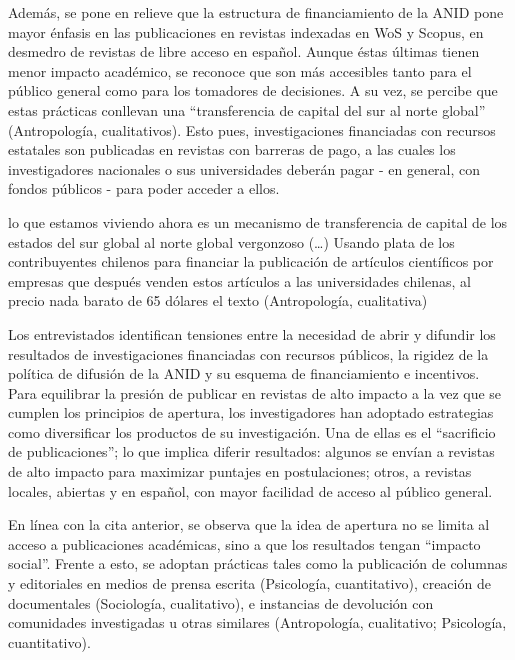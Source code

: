 \documentclass[
  letterpaper,
  DIV=11,
  numbers=noendperiod]{scrreprt}
\begin{document}
Además, se pone en relieve que la estructura de financiamiento de la
ANID pone mayor énfasis en las publicaciones en revistas indexadas en
WoS y Scopus, en desmedro de revistas de libre acceso en español. Aunque
éstas últimas tienen menor impacto académico, se reconoce que son más
accesibles tanto para el público general como para los tomadores de
decisiones. A su vez, se percibe que estas prácticas conllevan una
``transferencia de capital del sur al norte global'' (Antropología,
cualitativos). Esto pues, investigaciones financiadas con recursos
estatales son publicadas en revistas con barreras de pago, a las cuales
los investigadores nacionales o sus universidades deberán pagar - en
general, con fondos públicos - para poder acceder a ellos.

\begin{tcolorbox}[enhanced jigsaw, bottomrule=.15mm, breakable, colback=white, left=2mm, leftrule=.75mm, arc=.35mm, opacityback=0, rightrule=.15mm, toprule=.15mm]

lo que estamos viviendo ahora es un mecanismo de transferencia de
capital de los estados del sur global al norte global vergonzoso
(\ldots) Usando plata de los contribuyentes chilenos para financiar la
publicación de artículos científicos por empresas que después venden
estos artículos a las universidades chilenas, al precio nada barato de
65 dólares el texto (Antropología, cualitativa)

\end{tcolorbox}

Los entrevistados identifican tensiones entre la necesidad de abrir y
difundir los resultados de investigaciones financiadas con recursos
públicos, la rigidez de la política de difusión de la ANID y su esquema
de financiamiento e incentivos. Para equilibrar la presión de publicar
en revistas de alto impacto a la vez que se cumplen los principios de
apertura, los investigadores han adoptado estrategias como diversificar
los productos de su investigación. Una de ellas es el ``sacrificio de
publicaciones''; lo que implica diferir resultados: algunos se envían a
revistas de alto impacto para maximizar puntajes en postulaciones;
otros, a revistas locales, abiertas y en español, con mayor facilidad de
acceso al público general.

En línea con la cita anterior, se observa que la idea de apertura no se
limita al acceso a publicaciones académicas, sino a que los resultados
tengan ``impacto social''. Frente a esto, se adoptan prácticas tales
como la publicación de columnas y editoriales en medios de prensa
escrita (Psicología, cuantitativo), creación de documentales
(Sociología, cualitativo), e instancias de devolución con comunidades
investigadas u otras similares (Antropología, cualitativo; Psicología,
cuantitativo).
\end{document}
